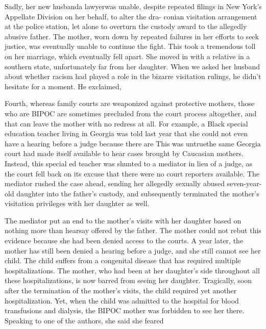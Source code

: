 Sadly, her new husband\mdash{}a lawyer\mdash{}was unable, despite 
repeated filings in New York's Appellate Division on her behalf, to alter the dra-
conian visitation arrangement at the police station, let alone to overturn
the custody award to the allegedly abusive father. The mother, worn
down by repeated failures in her efforts to seek justice, was eventually 
unable to continue the fight. This took a tremendous toll on her
marriage, which eventually fell apart. She moved in with a relative in a
southern state, unfortunately far from her daughter. When we asked her
husband about whether racism had played a role in the bizarre visitation
rulings, he didn’t hesitate for a moment. He exclaimed,  \pfl{}

Fourth, whereas family courts are weaponized against protective
mothers, those who are BIPOC are sometimes precluded from the court
process altogether, and that can leave the mother with no redress at all.
For example, a Black special education teacher living in Georgia was
told last year that she could not even have a hearing before a judge because there are  This was untrue\mdash{}the same
Georgia court had made itself available to hear cases brought by Caucasian mothers. Instead, this special ed teacher was shunted to a mediator in lieu of
a judge, as the court fell back on its excuse that there were no court
reporters available. The mediator rushed the case ahead, 
sending her allegedly sexually abused seven-year-old daughter 
into the father's custody, and subsequently 
terminated the mother's visitation privileges with her daughter
as well. \pfl{}

The mediator put an end to the mother’s visits with her daughter based
on nothing more than hearsay offered by the father. The mother could
not rebut this evidence because she had been denied access to the courts.
A year later, the mother has still been denied a hearing before a judge,
and she still cannot see her child. The child suffers from a congenital 
disease that has required multiple hospitalizations. The mother, who had
been at her daughter’s side throughout all these hospitalizations, is now
barred from seeing her daughter. Tragically, soon after the termination
of the mother's visits, the child required yet another hospitalization. Yet,
when the child was admitted to the hospital for blood transfusions and
dialysis, the BIPOC mother was forbidden to see her there. Speaking to
one of the authors, she said she feared  \pfl{}

